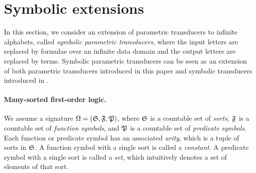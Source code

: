 
\section{Symbolic extensions}
\label{sec:symbolic}


In this section, we consider an extension of parametric transducers to infinite alphabets, called \emph{symbolic parametric transducers}, where the input letters are replaced by formulae over an infinite data domain and the output letters are replaced by terms. 
%
Symbolic parametric transducers can be seen as an extension of both parametric transducers introduced in this paper and symbolic transducers introduced in \cite{VHLMB12}.


\paragraph{Many-sorted first-order logic.}
We assume a signature $\Omega=({\mathfrak{S}}, {\mathfrak{F}}, {\mathfrak{P}})$, where ${\mathfrak{S}}$ is a countable set of \emph{sorts}, ${\mathfrak{F}}$ is a countable set of \emph{function symbols}, and ${\mathfrak{P}}$ is a countable set of \emph{predicate symbols}. Each function or predicate symbol has an associated \emph{arity}, which is a tuple of sorts in ${\mathfrak{S}}$.  A function symbol with a single sort is called a \emph{constant}. A predicate symbol with a single sort is called a \emph{set}, which intuitively denotes a set of elements of that sort.

